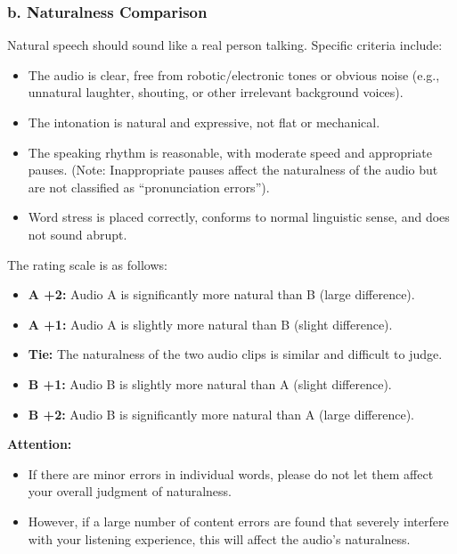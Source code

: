 \documentclass[]{bytedance_seed}
\begin{document}
\begin{promptbox}
\subsubsection*{b. Naturalness Comparison}
Natural speech should sound like a real person talking. Specific criteria include:
\begin{itemize}
    \item The audio is clear, free from robotic/electronic tones or obvious noise (e.g., unnatural laughter, shouting, or other irrelevant background voices).
    \item The intonation is natural and expressive, not flat or mechanical.
    \item The speaking rhythm is reasonable, with moderate speed and appropriate pauses. (Note: Inappropriate pauses affect the naturalness of the audio but are not classified as ``pronunciation errors'').
    \item Word stress is placed correctly, conforms to normal linguistic sense, and does not sound abrupt.
\end{itemize}

The rating scale is as follows:
\begin{itemize}
    \item \textbf{A +2:} Audio A is significantly more natural than B (large difference).
    \item \textbf{A +1:} Audio A is slightly more natural than B (slight difference).
    \item \textbf{Tie:} The naturalness of the two audio clips is similar and difficult to judge.
    \item \textbf{B +1:} Audio B is slightly more natural than A (slight difference).
    \item \textbf{B +2:} Audio B is significantly more natural than A (large difference).
\end{itemize}

\textbf{Attention:}
\begin{itemize}
    \item If there are minor errors in individual words, please do not let them affect your overall judgment of naturalness.
    \item However, if a large number of content errors are found that severely interfere with your listening experience, this will affect the audio's naturalness.
\end{itemize}

\end{promptbox}
\end{document}
